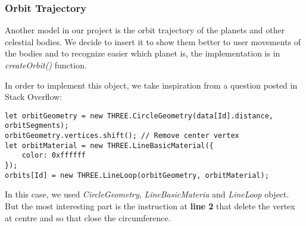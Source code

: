 \documentclass{article}
\begin{document}
\subsubsection{Orbit Trajectory}
Another model in our project is the orbit trajectory of the planets and other celestial bodies. We decide to insert it to show them better to user movements of the bodies and to recognize easier which planet is, the implementation is in \textit{createOrbit()} function. 
\par In order to implement this object, we take inspiration from a question posted in Stack Overflow\cite{trajectory:stackoverflow}:
\begin{lstlisting}
let orbitGeometry = new THREE.CircleGeometry(data[Id].distance, orbitSegments);
orbitGeometry.vertices.shift(); // Remove center vertex
let orbitMaterial = new THREE.LineBasicMaterial({
	color: 0xffffff
});
orbits[Id] = new THREE.LineLoop(orbitGeometry, orbitMaterial);
\end{lstlisting}
In this case, we used \textit{CircleGeometry}\cite{documentation:threejs}, \textit{LineBasicMateria}\cite{documentation:threejs} and \textit{LineLoop}\cite{documentation:threejs} object. But the most interesting part is the instruction at \textbf{line 2} that delete the vertex at centre and so that close the circumference.
\end{document}
